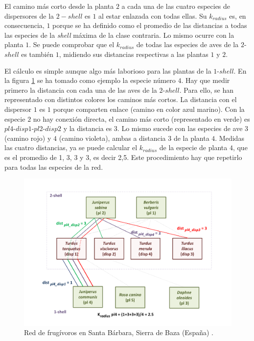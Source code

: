 El camino más corto desde la planta $2$ a cada una de las cuatro especies de dispersores de la $2-shell$ es $1$ al estar enlazada con todas ellas. Su $k_{radius}$ es, en consecuencia, $1$ porque se ha definido como el promedio de las distancias a todas las especies de la \textit{shell} máxima de la clase contraria. Lo mismo ocurre con la planta $1$. Se puede comprobar que el $k_{radius}$ de todas las especies de aves de la $2$-$shell$ es también $1$, midiendo sus distancias respectivas a las plantas $1$ y $2$.

El cálculo es simple aunque algo más laborioso para las plantas de la $1$-$shell$. En la figura \ref{fig:ESTATICA_SD_030_example_distances} se ha tomado como ejemplo la especie número $4$. Hay que medir primero la distancia con cada una de las aves de la $2$-$shell$. Para ello, se han representado con distintos colores los caminos más cortos. La distancia con el dispersor $1$ es $1$ porque comparten enlace (camino en color azul marino). Con la especie $2$ no hay conexión directa, el camino más corto (representado en verde) es $pl4$-$disp1$-$pl2$-$disp2$ y la distancia es $3$. Lo mismo sucede con las especies de ave $3$ (camino rojo) y $4$ (camino violeta), ambas a distancia $3$ de la planta $4$. Medidas las cuatro distancias, ya se puede calcular el $k_{radius}$ de la especie de planta $4$, que es el promedio de 1, 3, 3 y 3, es decir 2,5. Este procedimiento hay que repetirlo para todas las especies de la red.

\begin{figure}[h!]
\centering
\includegraphics[scale=0.5]{Figures/ESTATICA_SD_030_example_distances.pdf}
\caption {Red de frugívoros en Santa Bárbara, Sierra de Baza (España) \cite{jordano1993geographical}.}
\label{fig:ESTATICA_SD_030_example_distances}
\end{figure}

